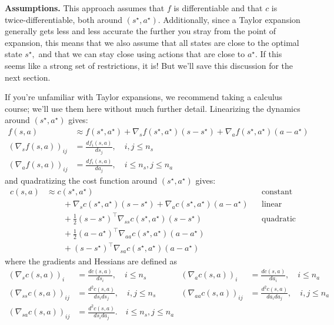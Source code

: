 \documentclass[../main/main]{subfiles}
\begin{document}
\textbf{Assumptions.} This approach assumes that $f$ is differentiable and that $c$ is twice-differentiable, both around $(s^\star, a^\star).$
Additionally, since a Taylor expansion generally gets less and less accurate the further you stray from the point of expansion, this means that we also assume that all states are close to the optimal state $s^\star,$
and that we can stay close using actions that are close to $a^\star.$
If this seems like a strong set of restrictions, it is! But we'll save this discussion for the next section.

If you're unfamiliar with Taylor expansions, we recommend taking a calculus course; we'll use them here without much further detail. Linearizing the dynamics around $(s^\star, a^\star)$ gives:
\begin{align*}
    f(s, a) &\approx f(s^\star, a^\star) + \nabla_s f(s^\star, a^\star) (s - s^\star) + \nabla_a f(s^\star, a^\star) (a - a^\star) \\
    (\nabla_s f(s, a))_{ij} &= \frac{d f_i(s, a)}{d s_j}, \quad i, j \le n_s \\
    (\nabla_a f(s, a))_{ij} &= \frac{d f_i(s, a)}{d a_j}, \quad i \le n_s, j \le n_a
\end{align*}
and quadratizing the cost function around $(s^\star, a^\star)$ gives:
\begin{align*}
    c(s, a) &\approx c(s^\star, a^\star) && \text{constant} \\
    &\qquad + \nabla_s c(s^\star, a^\star) (s - s^\star) + \nabla_a c(s^\star, a^\star) (a - a^\star) && \text{linear} \\
    &\qquad + \frac{1}{2} (s - s^\star)^\top \nabla_{ss} c(s^\star, a^\star) (s - s^\star) && \text{quadratic} \\
    &\qquad + \frac{1}{2} (a - a^\star)^\top \nabla_{aa} c(s^\star, a^\star) (a - a^\star) \\
    &\qquad + (s - s^\star)^\top \nabla_{sa} c(s^\star, a^\star) (a - a^\star)
\end{align*}
where the gradients and Hessians are defined as
\begin{align*}
    (\nabla_s c(s, a))_{i} &= \frac{d c(s, a)}{d s_i}, \quad i \le n_s
    & (\nabla_a c(s, a))_{i} &= \frac{d c(s, a)}{d a_i}, \quad i \le n_a \\
    (\nabla_{ss} c(s, a))_{ij} &= \frac{d^2 c(s, a)}{d s_i d s_j}, \quad i, j \le n_s
    & (\nabla_{aa} c(s, a))_{ij} &= \frac{d^2 c(s, a)}{d a_i d a_j}, \quad i, j \le n_a \\
    (\nabla_{sa} c(s, a))_{ij} &= \frac{d^2 c(s, a)}{d s_i d a_j}. \quad i \le n_s, j \le n_a
\end{align*}
\end{document}

